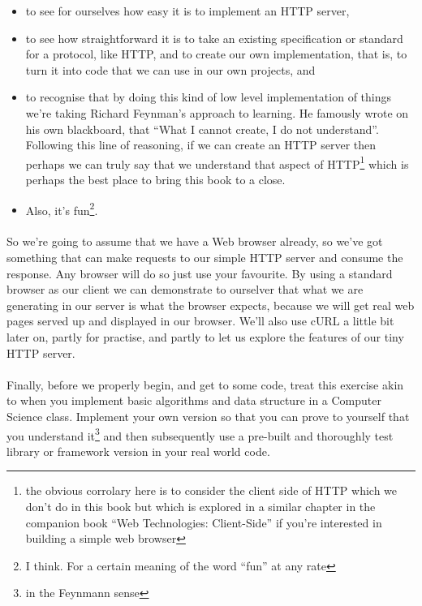 \begin{itemize}
\item to see for ourselves how easy it is to implement an HTTP server,
\item to see how straightforward it is to take an existing specification or standard for a protocol, like HTTP, and to create our own implementation, that is, to turn it into code that we can use in our own projects, and
\item to recognise that by doing this kind of low level implementation of things we're taking Richard Feynman's approach to learning. He famously wrote on his own blackboard, that ``What I cannot create, I do not understand''. Following this line of reasoning, if we can create an HTTP server then perhaps we can truly say that we understand that aspect of HTTP\footnote{the obvious corrolary here is to consider the client side of HTTP which we don't do in this book but which is explored in a similar chapter in the companion book ``Web Technologies: Client-Side'' if you're interested in building a simple web browser} which is perhaps the best place to bring this book to a close.
\item Also, it's fun\footnote{I think. For a certain meaning of the word ``fun'' at any rate}.
\end{itemize}

\paragraph{} So we're going to assume that we have a Web browser already, so we've got something that can make requests to our simple HTTP server and consume the response. Any browser will do so just use your favourite. By using a standard browser as our client we can demonstrate to ourselver that what we are generating in our server is what the browser expects, because we will get real web pages served up and displayed in our browser. We'll also use cURL a little bit later on, partly for practise, and partly to let us explore the features of our tiny HTTP server.

\paragraph{} Finally, before we properly begin, and get to some code, treat this exercise akin to when you implement basic algorithms and data structure in a Computer Science class. Implement your own version so that you can prove to yourself that you understand it\footnote{in the Feynmann sense} and then subsequently use a pre-built and thoroughly test library or framework version in your real world code. 

